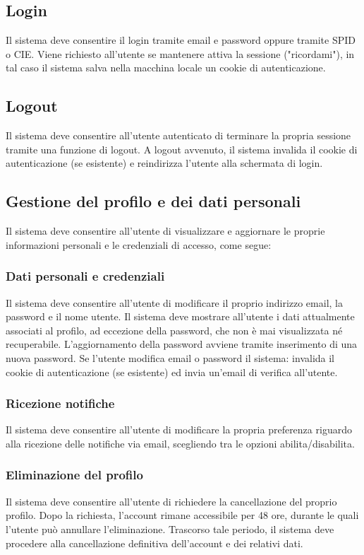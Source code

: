 \begin{rfscope}
\subsection{Login} \label{rf:login}
Il sistema deve consentire il login tramite email e password oppure tramite SPID o CIE\@. Viene richiesto all'utente se mantenere attiva la sessione ("ricordami"), in tal caso il sistema salva nella macchina locale un cookie di autenticazione.

\subsection{Logout} \label{rf:logout}
Il sistema deve consentire all’utente autenticato di terminare la propria sessione tramite una funzione di logout.
A logout avvenuto, il sistema invalida il cookie di autenticazione (se esistente) e reindirizza l’utente alla schermata di login.

\subsection{Gestione del profilo e dei dati personali} \label{rf:gestioneprofiloedati}
Il sistema deve consentire all’utente di visualizzare e aggiornare le proprie informazioni personali e le credenziali di accesso, come segue:

\subsubsection{Dati personali e credenziali} \label{rf:datiecred}
Il sistema deve consentire all’utente di modificare il proprio indirizzo email, la password e il nome utente.
Il sistema deve mostrare all’utente i dati attualmente associati al profilo, ad eccezione della password, che non è mai visualizzata né recuperabile.
L’aggiornamento della password avviene tramite inserimento di una nuova password.
Se l'utente modifica email o password il sistema: invalida il cookie di autenticazione (se esistente) ed invia un'email di verifica all'utente.

\subsubsection{Ricezione notifiche} \label{rf:prefnotifiche}
Il sistema deve consentire all’utente di modificare la propria preferenza riguardo alla ricezione delle notifiche via email, scegliendo tra le opzioni abilita/disabilita.

\subsubsection{Eliminazione del profilo} \label{rf:eliminazioneprofilo}
Il sistema deve consentire all’utente di richiedere la cancellazione del proprio profilo.
Dopo la richiesta, l’account rimane accessibile per 48 ore, durante le quali l’utente può annullare l’eliminazione.
Trascorso tale periodo, il sistema deve procedere alla cancellazione definitiva dell’account e dei relativi dati.


\end{rfscope}
